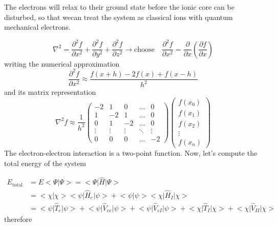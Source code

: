 \documentclass[10pt]{article}
\numberwithin{equation}{section}
\theoremstyle{defi}
\begin{document}
\begin{mdframed}[backgroundcolor = gray!30,
  frametitle = Idea, roundcorner = 10pt]
  The electrons will relax to their ground state before the ionic core can be disturbed, so that wecan treat the system as classical ions with quantum mechanical electrons.
\end{mdframed}

\begin{equation*}
  \nabla^2 = \frac{\partial^2 f}{\partial x^2} + \frac{\partial^2 f}{\partial y^2} + \frac{\partial^2 f}{\partial z^2} \rightarrow \text{choose}\quad 
  \frac{\partial^2 f}{\partial x^2}  = \frac{\partial}{\partial x}\left(\frac{\partial f}{\partial x}\right)
\end{equation*}
writing the numerical approximation
\begin{equation}
  \label{eq:5}
  \frac{\partial^2 f}{\partial x^2} \approx \frac{f(x+h) - 2f(x) + f(x-h)}{h^2}
\end{equation}
and its matrix representation
\begin{equation}
  \label{eq:6}
  \nabla^2 f \approx \frac{1}{h^2}\begin{pmatrix}
    -2 & 1 & 0 & \dots & 0\\
    1 & -2 & 1 & \dots & 0\\
    0 & 1 & -2 & \dots & 0\\
    \vdots & \vdots & \vdots & \ddots & \vdots\\
    0 & 0 & 0 & \dots & -2
  \end{pmatrix} 
  \begin{pmatrix}
    f(x_0)\\
    f(x_1)\\
    f(x_2)\\
    \vdots\\
    f(x_n)
  \end{pmatrix}
\end{equation}
The electron-electron interaction is a two-point function. Now, let's compute the total energy of the system

\begin{align*}
  E_{\text{total}} &= E\big<\Psi\big|\Psi\big> = \big<\Psi\big|\hat{H}\big|\Psi\big>\\
&= \big<\chi\big|\chi\big>\big<\psi\big|\hat{H}_e\big|\psi\big> + \big<\psi\big|\psi\big>\big<\chi\big|\hat{H}_I\big|\chi\big>\\
  &= \big<\psi\big|\hat{T}_e\big|\psi\big> + \big<\psi\big|\hat{V}_{ee}\big|\psi\big> + \big<\psi\big|\hat{V}_{eI}\big|\psi\big> + \big<\chi\big|\hat{T}_I\big|\chi\big> + \big<\chi\big|\hat{V}_{II}\big|\chi\big> 
\end{align*}
therefore 
\end{document}
